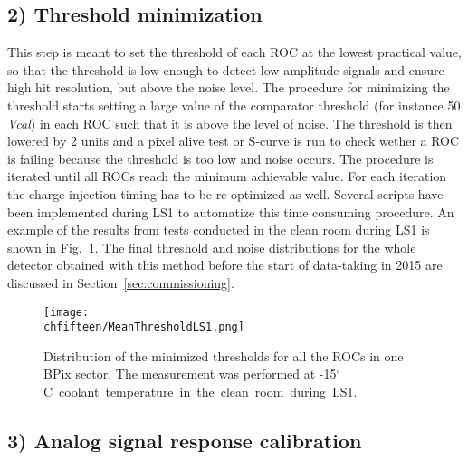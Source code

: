 \subsection*{2) Threshold minimization}

This step is meant to set the threshold of each ROC at the lowest practical value, so that the threshold is low enough to detect low amplitude signals and ensure high hit resolution,
but above the noise level.
The procedure for minimizing the threshold starts setting a large value of the comparator threshold (for instance 50 \textit{Vcal}) in each ROC such that it is above the level of noise.
The threshold is then lowered by 2 units and a pixel alive test or S-curve is run to check wether a ROC is failing because the threshold is too low and noise occurs.
The procedure is iterated until all ROCs reach the minimum achievable value. For each iteration the charge injection timing has to be re-optimized as well.
Several scripts have been implemented during LS1 to automatize this time consuming procedure. An example of the results from tests conducted in the clean room during LS1 is shown in Fig.~\ref{fig:ThrCalibLS1}.
The final threshold and noise distributions for the whole detector obtained with this method before the start of data-taking in 2015 are discussed in Section~\ref{sec:commissioning}.

\begin{figure}[!htb]
\begin{center}
 \texttt{[image: \\chfifteen/MeanThresholdLS1.png]}
 \end{center}
 \caption{Distribution of the minimized thresholds for all the ROCs in one BPix sector. The measurement was performed at -15\unit{$^\circ$C} coolant temperature in the clean room during LS1.}
 \label{fig:ThrCalibLS1}
\end{figure}

\subsection*{3) Analog signal response calibration}


